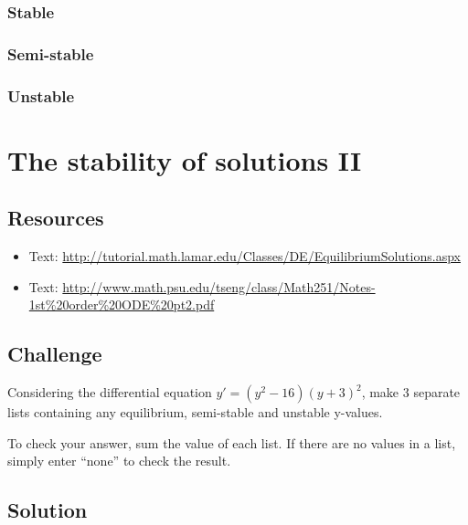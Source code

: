 \subsubsection*{Stable}
\six{}


\subsubsection*{Semi-stable}
\six{}


\subsubsection*{Unstable}
\six{}


\timebox



\newpage
\section{The stability of solutions II}

\subsection*{Resources}
\begin{itemize}
    \item Text: \url{http://tutorial.math.lamar.edu/Classes/DE/EquilibriumSolutions.aspx}
    \item Text: \url{http://www.math.psu.edu/tseng/class/Math251/Notes-1st\%20order\%20ODE\%20pt2.pdf}
\end{itemize}

\subsection*{Challenge}
Considering the differential equation $y'=(y^2-16)(y+3)^2$, make 3 separate lists containing any equilibrium, semi-stable and unstable y-values.

To check your answer, sum the value of each list. If there are no values in a list, simply enter ``none'' to check the result.

\subsection*{Solution}
